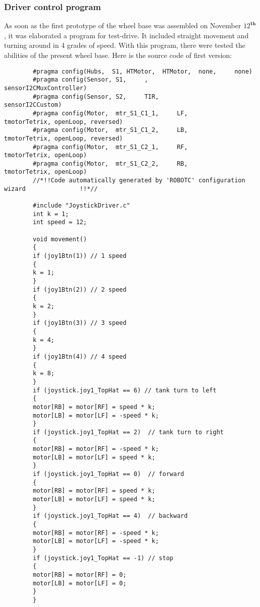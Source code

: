 \subsubsection{Driver control program}
	
	\begin{enumerate*}
	    \item As soon as the first prototype of the wheel base was assembled on November $12^\textbf{th}$, it was elaborated a program for test-drive. It included straight movement and turning around in 4 grades of speed. With this program, there were tested the abilities of the present wheel base. \newline
	    Here is the source code of first version:\newline
	    {\small
	    \begin{verbatim}
	    #pragma config(Hubs,  S1, HTMotor,  HTMotor,  none,     none)
	    #pragma config(Sensor, S1,     ,               sensorI2CMuxController)
	    #pragma config(Sensor, S2,     TIR,            sensorI2CCustom)
	    #pragma config(Motor,  mtr_S1_C1_1,     LF,            tmotorTetrix, openLoop, reversed)
	    #pragma config(Motor,  mtr_S1_C1_2,     LB,            tmotorTetrix, openLoop, reversed)
	    #pragma config(Motor,  mtr_S1_C2_1,     RF,            tmotorTetrix, openLoop)
	    #pragma config(Motor,  mtr_S1_C2_2,     RB,            tmotorTetrix, openLoop)
	    //*!!Code automatically generated by 'ROBOTC' configuration wizard               !!*//
	    
	    #include "JoystickDriver.c"
	    int k = 1;
	    int speed = 12;
	    
	    void movement()
	    {
	    if (joy1Btn(1))	// 1 speed
	    {
	    k = 1;
	    }
	    if (joy1Btn(2))	// 2 speed
	    {
	    k = 2;
	    }
	    if (joy1Btn(3))	// 3 speed
	    {
	    k = 4;
	    }
	    if (joy1Btn(4))	// 4 speed
	    {
	    k = 8;
	    }
	    if (joystick.joy1_TopHat == 6) // tank turn to left
	    {
	    motor[RB] = motor[RF] = speed * k;
	    motor[LB] = motor[LF] = -speed * k;
	    }
	    if (joystick.joy1_TopHat == 2)	// tank turn to right
	    {
	    motor[RB] = motor[RF] = -speed * k;
	    motor[LB] = motor[LF] = speed * k;
	    }
	    if (joystick.joy1_TopHat == 0)	// forward
	    {
	    motor[RB] = motor[RF] = speed * k;
	    motor[LB] = motor[LF] = speed * k;
	    }
	    if (joystick.joy1_TopHat == 4)	// backward
	    {
	    motor[RB] = motor[RF] = -speed * k;
	    motor[LB] = motor[LF] = -speed * k;
	    }
	    if (joystick.joy1_TopHat == -1)	// stop
	    {
	    motor[RB] = motor[RF] = 0;
	    motor[LB] = motor[LF] = 0;
	    }
	    }
	    

\end{verbatim}}
\end{enumerate*}
